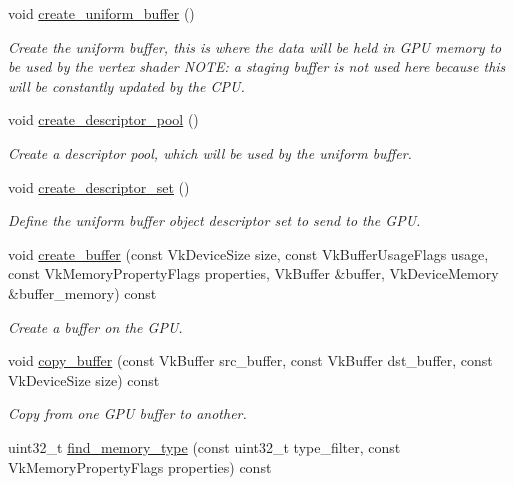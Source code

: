 \begin{DoxyCompactItemize}
void \mbox{\hyperlink{classvulkan__application_a9be5f7de709b8b4d5521b9aad6c8dca8}{create\+\_\+uniform\+\_\+buffer}} ()
\begin{DoxyCompactList}\small\item\em Create the uniform buffer, this is where the data will be held in G\+PU memory to be used by the vertex shader N\+O\+TE\+: a staging buffer is not used here because this will be constantly updated by the C\+PU. \end{DoxyCompactList}\item 
void \mbox{\hyperlink{classvulkan__application_ad7d34d19acdedb176ad2e1bb23ed6af4}{create\+\_\+descriptor\+\_\+pool}} ()
\begin{DoxyCompactList}\small\item\em Create a descriptor pool, which will be used by the uniform buffer. \end{DoxyCompactList}\item 
void \mbox{\hyperlink{classvulkan__application_af2de0218b31f62a692241b26dfbeb8f6}{create\+\_\+descriptor\+\_\+set}} ()
\begin{DoxyCompactList}\small\item\em Define the uniform buffer object descriptor set to send to the G\+PU. \end{DoxyCompactList}\item 
void \mbox{\hyperlink{classvulkan__application_a85e6c1d77defccbf744383ce207cbd0a}{create\+\_\+buffer}} (const Vk\+Device\+Size size, const Vk\+Buffer\+Usage\+Flags usage, const Vk\+Memory\+Property\+Flags properties, Vk\+Buffer \&buffer, Vk\+Device\+Memory \&buffer\+\_\+memory) const
\begin{DoxyCompactList}\small\item\em Create a buffer on the G\+PU. \end{DoxyCompactList}\item 
void \mbox{\hyperlink{classvulkan__application_a41c0a64b0e78cb7e22700e35718e91f8}{copy\+\_\+buffer}} (const Vk\+Buffer src\+\_\+buffer, const Vk\+Buffer dst\+\_\+buffer, const Vk\+Device\+Size size) const
\begin{DoxyCompactList}\small\item\em Copy from one G\+PU buffer to another. \end{DoxyCompactList}\item 
uint32\+\_\+t \mbox{\hyperlink{classvulkan__application_ac5cbbeac91acbaad41d204567e6729ab}{find\+\_\+memory\+\_\+type}} (const uint32\+\_\+t type\+\_\+filter, const Vk\+Memory\+Property\+Flags properties) const

\end{DoxyCompactItemize}
